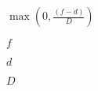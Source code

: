 \documentclass{article}
\begin{document}
$\max(0, \frac{(f-d)}{D})$
\pagebreak

$ f $
\pagebreak

$ d $
\pagebreak

$ D $
\pagebreak
\end{document}
